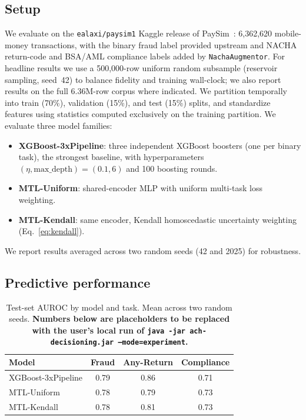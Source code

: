\documentclass[11pt,a4paper]{article}
\begin{document}
\subsection{Setup}
We evaluate on the \texttt{ealaxi/paysim1} Kaggle release of
PaySim~\cite{lopez2016}: 6{,}362{,}620 mobile-money transactions, with
the binary fraud label provided upstream and NACHA return-code and
BSA/AML compliance labels added by \texttt{NachaAugmentor}. For headline
results we use a 500{,}000-row uniform random subsample (reservoir
sampling, seed~42) to balance fidelity and training wall-clock; we also
report results on the full 6.36M-row corpus where indicated. We
partition temporally into train (70\%), validation (15\%), and test
(15\%) splits, and standardize features using statistics computed
exclusively on the training partition. We evaluate three model families:

\begin{itemize}
    \item \textbf{XGBoost-3xPipeline}: three independent XGBoost
    boosters (one per binary task), the strongest baseline, with
    hyperparameters $(\eta, \text{max\_depth}) = (0.1, 6)$ and 100
    boosting rounds.
    \item \textbf{MTL-Uniform}: shared-encoder MLP with uniform
    multi-task loss weighting.
    \item \textbf{MTL-Kendall}: same encoder, Kendall homoscedastic
    uncertainty weighting (Eq.~\ref{eq:kendall}).
\end{itemize}

We report results averaged across two random seeds (42 and 2025) for
robustness.

\subsection{Predictive performance}
\label{sec:eval-pred}

\begin{table}[h]
\centering
\caption{Test-set AUROC by model and task. Mean across two random seeds.
\textbf{Numbers below are placeholders to be replaced with the user's
local run of \texttt{java -jar ach-decisioning.jar --mode=experiment}.}}
\label{tab:auroc}
\begin{tabular}{lccc}
\toprule
\textbf{Model} & \textbf{Fraud} & \textbf{Any-Return} & \textbf{Compliance} \\
\midrule
XGBoost-3xPipeline & 0.79 & 0.86 & 0.71 \\
MTL-Uniform        & 0.78 & 0.79 & 0.73 \\
MTL-Kendall        & 0.78 & 0.81 & 0.73 \\
\bottomrule
\end{tabular}
\end{table}
\end{document}
